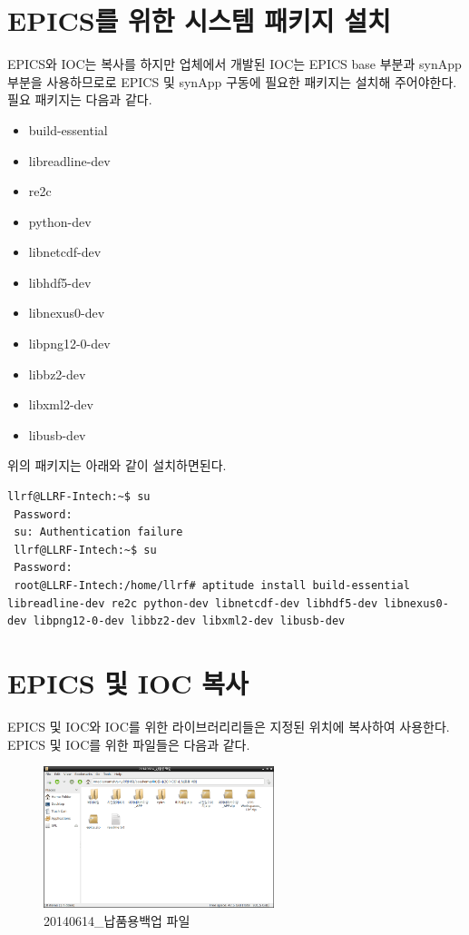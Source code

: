 \documentclass[11pt
  , a4paper
  , article
  , oneside
]{memoir}
\begin{document}
\section{EPICS를 위한 시스템 패키지 설치}
EPICS와 IOC는 복사를 하지만 업체에서 개발된 IOC는 EPICS base 부분과 synApp 부분을 사용하므로로 EPICS 및 synApp 구동에 필요한 패키지는 설치해 주어야한다. 필요 패키지는 다음과 같다.
\begin{itemize}
	\item build-essential
	\item libreadline-dev
	\item re2c
	\item python-dev
	\item libnetcdf-dev
	\item libhdf5-dev
	\item libnexus0-dev
	\item libpng12-0-dev
	\item libbz2-dev
	\item libxml2-dev
	\item libusb-dev
\end{itemize}
위의 패키지는 아래와 같이 설치하면된다.
\begin{lstlisting}[style=termstyle]
 llrf@LLRF-Intech:~$ su
 Password: 
 su: Authentication failure
 llrf@LLRF-Intech:~$ su
 Password: 
 root@LLRF-Intech:/home/llrf# aptitude install build-essential libreadline-dev re2c python-dev libnetcdf-dev libhdf5-dev libnexus0-dev libpng12-0-dev libbz2-dev libxml2-dev libusb-dev
\end{lstlisting}
\section{EPICS 및 IOC 복사}
EPICS 및 IOC와 IOC를 위한 라이브러리리들은 지정된 위치에 복사하여 사용한다. EPICS 및 IOC를 위한 파일들은 다음과 같다.
\begin{figure}[h!]
	\centering
	\includegraphics[width=0.6\textwidth, height=0.3\textwidth]{./images/1.png}
	\caption{20140614\_납품용백업 파일}
\end{figure}
\end{document}
